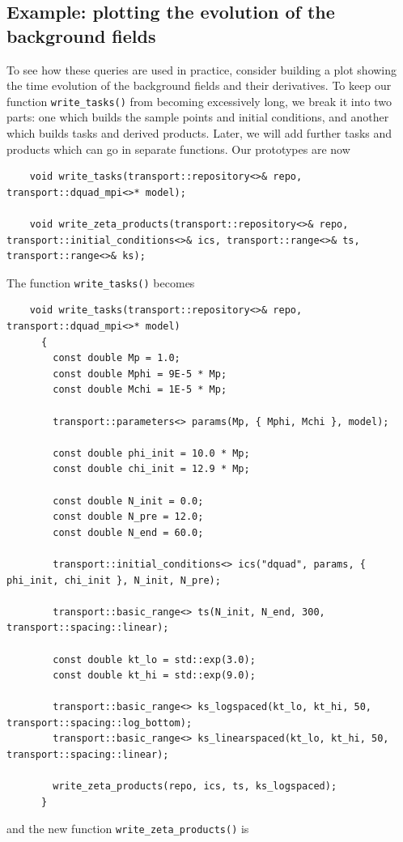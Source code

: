 \documentclass[11pt,a4paper]{article}
\begin{document}
\subsection{Example: plotting the evolution of the background fields}
\label{sec:example-backg-evolve}
To see how these queries are used in practice,
consider building a plot showing the time evolution of the background
fields and their derivatives.
To keep our function
\texttt{write_tasks()} from becoming excessively long, we break it
into two parts: one which builds the sample points and initial conditions,
and another which builds tasks and derived products.
Later, we will add further tasks and products which can go in separate functions.
Our prototypes are now
\begin{verbatim}
	void write_tasks(transport::repository<>& repo, transport::dquad_mpi<>* model);
	
	void write_zeta_products(transport::repository<>& repo, transport::initial_conditions<>& ics, transport::range<>& ts, transport::range<>& ks);	
\end{verbatim}
The function \texttt{write_tasks()} becomes
\begin{verbatim}
	void write_tasks(transport::repository<>& repo, transport::dquad_mpi<>* model)
	  {
	    const double Mp = 1.0;
	    const double Mphi = 9E-5 * Mp;
	    const double Mchi = 1E-5 * Mp;
	
	    transport::parameters<> params(Mp, { Mphi, Mchi }, model);
	
	    const double phi_init = 10.0 * Mp;
	    const double chi_init = 12.9 * Mp;
	
	    const double N_init = 0.0;
	    const double N_pre = 12.0;
	    const double N_end = 60.0;
	
	    transport::initial_conditions<> ics("dquad", params, { phi_init, chi_init }, N_init, N_pre);
	
	    transport::basic_range<> ts(N_init, N_end, 300, transport::spacing::linear);
	
	    const double kt_lo = std::exp(3.0);
	    const double kt_hi = std::exp(9.0);
	
	    transport::basic_range<> ks_logspaced(kt_lo, kt_hi, 50, transport::spacing::log_bottom);
	    transport::basic_range<> ks_linearspaced(kt_lo, kt_hi, 50, transport::spacing::linear);
	
	    write_zeta_products(repo, ics, ts, ks_logspaced);
	  }
\end{verbatim}
and the new function
\texttt{write_zeta_products()} is
\end{document}
